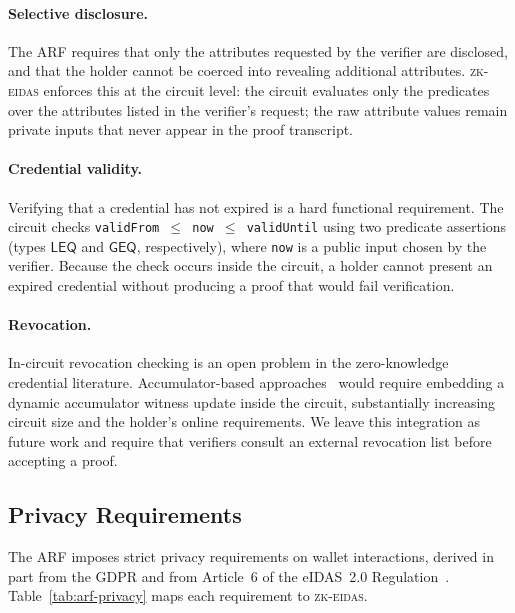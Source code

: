 \paragraph{Selective disclosure.}
The ARF requires that only the attributes requested by the verifier
are disclosed, and that the holder cannot be coerced into revealing
additional attributes.
\textsc{zk-eidas} enforces this at the circuit level: the circuit
evaluates only the predicates over the attributes listed in the
verifier's request; the raw attribute values remain private inputs
that never appear in the proof transcript.

\paragraph{Credential validity.}
Verifying that a credential has not expired is a hard functional
requirement.
The circuit checks \texttt{validFrom $\leq$ now $\leq$ validUntil}
using two predicate assertions (types $\mathsf{LEQ}$ and
$\mathsf{GEQ}$, respectively), where \texttt{now} is a public input
chosen by the verifier.
Because the check occurs inside the circuit, a holder cannot present
an expired credential without producing a proof that would fail
verification.

\paragraph{Revocation.}
In-circuit revocation checking is an open problem in the zero-knowledge
credential literature.
Accumulator-based approaches~\cite{camenisch2001} would require
embedding a dynamic accumulator witness update inside the circuit,
substantially increasing circuit size and the holder's online
requirements.
We leave this integration as future work and require that verifiers
consult an external revocation list before accepting a proof.

\subsection{Privacy Requirements}\label{sec:eudi-privacy}

The ARF imposes strict privacy requirements on wallet interactions,
derived in part from the GDPR and from Article~6 of the eIDAS~2.0
Regulation~\cite{eidas2}.
Table~\ref{tab:arf-privacy} maps each requirement to
\textsc{zk-eidas}.

